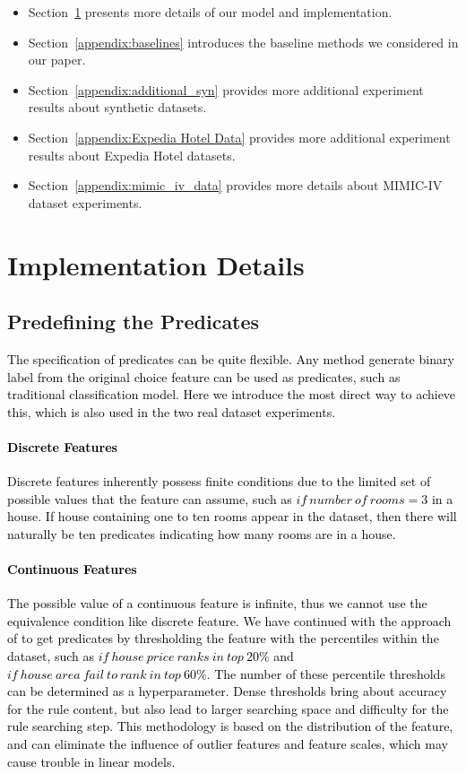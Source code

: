 \documentclass{article} %
\begin{document}
\begin{itemize}
    \item Section~\ref{appendix:implementation} presents more details of our model and implementation.
    \item Section~\ref{appendix:baselines} introduces the baseline methods we considered in our paper.
    \item Section~\ref{appendix:additional_syn} provides more additional experiment results about synthetic datasets.
    \item Section~\ref{appendix:Expedia Hotel Data} provides more additional experiment results about Expedia Hotel datasets.
    \item Section~\ref{appendix:mimic_iv_data} provides more details about MIMIC-IV dataset experiments.
\end{itemize}

\section{Implementation Details}
\label{appendix:implementation}
\subsection{Predefining the Predicates}
\textcolor{black}{
The specification of predicates can be quite flexible. Any method generate binary label from the original choice feature can be used as predicates, such as traditional classification model. Here we introduce the most direct way to achieve this, which is also used in the two real dataset experiments.
\paragraph{Discrete Features}
Discrete features inherently possess finite conditions due to the limited set of possible values that the feature can assume, such as $if\ number\ of\ rooms = 3$ in a house. If house containing one to ten rooms appear in the dataset, then there will naturally be ten predicates indicating how many rooms are in a house.
\paragraph{Continuous Features}
The possible value of a continuous feature is infinite, thus we cannot use the equivalence condition like discrete feature. We have continued with the approach of \citet{wei2019generalized} to get predicates by thresholding the feature with the percentiles within the dataset, such as $if\ house\ price\ ranks\ in\ top\ 20\%$ and $if\ house\ area\ fail\ to\ rank\ in\ top\ 60\%$. The number of these percentile thresholds can be determined as a hyperparameter. Dense thresholds bring about accuracy for the rule content, but also lead to larger searching space and difficulty for the rule searching step. This methodology is based on the distribution of the feature, and can eliminate the influence of outlier features and feature scales, which may cause trouble in linear models.
}
\end{document}
